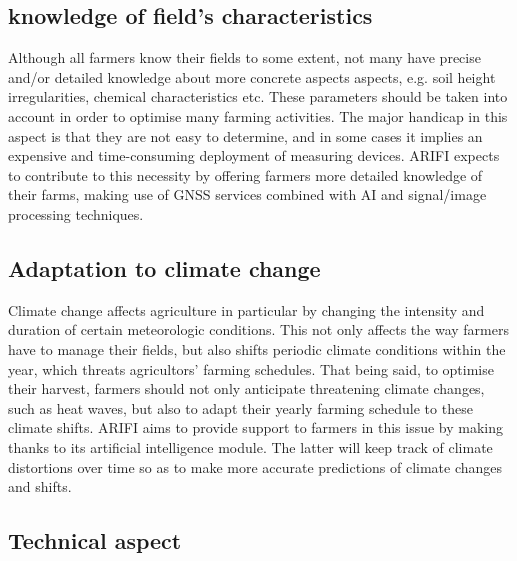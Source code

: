 \subsection{knowledge of field's characteristics}
Although all farmers know their fields to some extent, not many have precise and/or detailed knowledge about more concrete aspects aspects, e.g. soil height irregularities, chemical characteristics etc. These parameters should be taken into account in order to optimise many farming activities. The major handicap in this aspect is that they are not easy to determine, and in some cases it implies an expensive and time-consuming deployment of measuring devices. ARIFI expects to contribute to this necessity by offering farmers more detailed knowledge of their farms, making use of GNSS services combined with AI and signal/image processing techniques.
\subsection{Adaptation to climate change}
Climate change affects agriculture in particular by changing the intensity and duration of certain meteorologic conditions. This not only affects the way farmers have to manage their fields, but also shifts periodic climate conditions within the year, which threats agricultors' farming schedules. That being said, to optimise their harvest, farmers should not only anticipate threatening climate changes, such as heat waves, but also to adapt their yearly farming schedule to these climate shifts.
ARIFI aims to provide support to farmers in this issue by making thanks to its artificial intelligence module. The latter will keep track of climate distortions over time so as to make more accurate predictions of climate changes and shifts.  

\subsection{Technical aspect}
